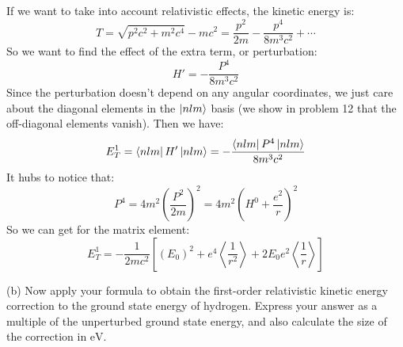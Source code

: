 \documentclass[12pt]{article}
\begin{document}
\subsection{}
If we want to take into account relativistic effects, the kinetic energy is:
\begin{equation}
  T = \sqrt{p^2c^2 + m^2c^4} - mc^2 = \frac{p^2}{2m} - \frac{p^4}{8m^3c^2} + \cdots
\end{equation}
So we want to find the effect of the extra term, or perturbation:
\begin{equation}
  H' = -\frac{P^4}{8m^3c^2}
\end{equation}
Since the perturbation doesn't depend on any angular coordinates, we just care about the diagonal elements in the $\ket{nlm}$ basis (we show in problem 12 that the off-diagonal elements vanish). Then we have:
\begin{equation}
  E^{1}_T = \bra{nlm}H'\ket{nlm} = -\frac{\bra{nlm}P^4\ket{nlm}}{8m^3c^2}
\end{equation}
It hubs to notice that:
\begin{equation}
  P^4 = 4m^2\left(\frac{P^2}{2m} \right)^2 = 4m^2\left(H^0 + \frac{e^2}{r} \right)^2
\end{equation}
So we can get for the matrix element:
\begin{equation}
  E^{1}_T = -\frac{1}{2mc^{2}}  \left[ (E_0)^{2}+e^4\left\langle\frac{1}{r^2}\right\rangle+2 E_0e^2\left\langle\frac{1}{r}\right\rangle\right]
\end{equation}

(b) Now apply your formula to obtain the first-order relativistic kinetic energy correction to the ground state energy of hydrogen. Express your answer as a multiple of the unperturbed ground state energy, and also calculate the size of the correction in $\mathrm{eV}$.
\end{document}
